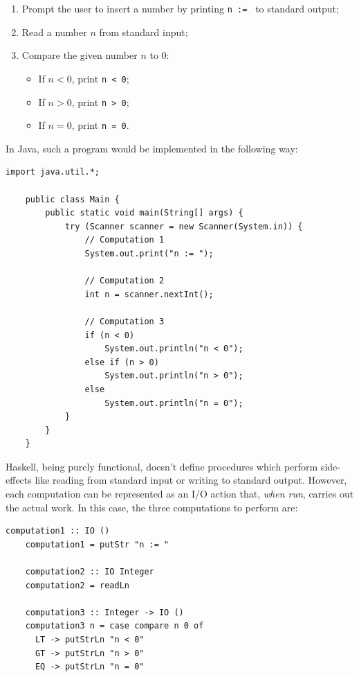 \documentclass[UdineBachThesis,american,11pt]{PhdThesis}
\begin{document}
  \begin{enumerate}
    \item Prompt the user to insert a number by printing \mbox{\texttt{n := }}
    to standard output;

    \item Read a number $n$ from standard input;

    \item Compare the given number $n$ to $0$:

    \begin{itemize}[noitemsep]
      \item If \mbox{$n < 0$}, print \mbox{\texttt{n < 0}};
      \item If \mbox{$n > 0$}, print \mbox{\texttt{n > 0}};
      \item If \mbox{$n = 0$}, print \mbox{\texttt{n = 0}}.
    \end{itemize}
  \end{enumerate}

  In Java, such a program would be implemented in the following way:

  \begin{Verbatim}[gobble=4,fontsize=\small]
    import java.util.*;

    public class Main {
        public static void main(String[] args) {
            try (Scanner scanner = new Scanner(System.in)) {
                // Computation 1
                System.out.print("n := ");

                // Computation 2
                int n = scanner.nextInt();

                // Computation 3
                if (n < 0)
                    System.out.println("n < 0");
                else if (n > 0)
                    System.out.println("n > 0");
                else
                    System.out.println("n = 0");
            }
        }
    }
  \end{Verbatim}

  Haskell, being purely functional, doesn't define procedures which perform
  side-effects like reading from standard input or writing to standard output.
  However, each computation can be represented as an I/O action that, \emph{when
  run}, carries out the actual work. In this case, the three computations to
  perform are:

  \begin{Verbatim}[gobble=4,fontsize=\small]
    computation1 :: IO ()
    computation1 = putStr "n := "

    computation2 :: IO Integer
    computation2 = readLn

    computation3 :: Integer -> IO ()
    computation3 n = case compare n 0 of
      LT -> putStrLn "n < 0"
      GT -> putStrLn "n > 0"
      EQ -> putStrLn "n = 0"
  \end{Verbatim}
\end{document}
